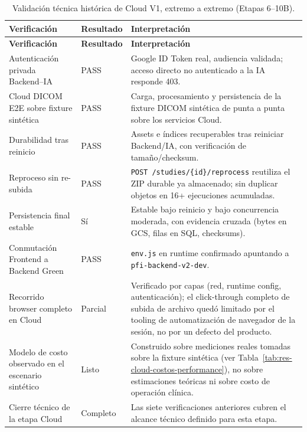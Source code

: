 {\scriptsize
\setlength{\LTleft}{0pt}
\setlength{\LTright}{0pt}
\setlength{\tabcolsep}{3pt}
\renewcommand{\arraystretch}{1.18}
\begin{longtable}{>{\raggedright\arraybackslash}p{} >{\raggedright\arraybackslash}p{} >{\raggedright\arraybackslash}p{}}
\caption{Validación técnica histórica de Cloud V1, extremo a extremo (Etapas 6--10B).}\label{tab:res-cloud-e2e}\\
\hline
\textbf{Verificación} & \textbf{Resultado} & \textbf{Interpretación} \\
\hline
\endfirsthead
\hline
\textbf{Verificación} & \textbf{Resultado} & \textbf{Interpretación} \\
\hline
\endhead
\hline
\endfoot
Autenticación privada Backend--IA & PASS & Google ID Token real, audiencia validada; acceso directo no autenticado a la IA responde 403. \\
Cloud DICOM E2E sobre fixture sintética & PASS & Carga, procesamiento y persistencia de la fixture DICOM sintética de punta a punta sobre los servicios Cloud. \\
Durabilidad tras reinicio & PASS & Assets e índices recuperables tras reiniciar Backend/IA, con verificación de tamaño/checksum. \\
Reproceso sin re-subida & PASS & \texttt{POST /studies/\{id\}/reprocess} reutiliza el ZIP durable ya almacenado; sin duplicar objetos en 16+ ejecuciones acumuladas. \\
Persistencia final estable & Sí & Estable bajo reinicio y bajo concurrencia moderada, con evidencia cruzada (bytes en GCS, filas en SQL, checksums). \\
Conmutación Frontend a Backend Green & PASS & \texttt{env.js} en runtime confirmado apuntando a \texttt{pfi-backend-v2-dev}. \\
Recorrido browser completo en Cloud & Parcial & Verificado por capas (red, runtime config, autenticación); el click-through completo de subida de archivo quedó limitado por el tooling de automatización de navegador de la sesión, no por un defecto del producto. \\
Modelo de costo observado en el escenario sintético & Listo & Construido sobre mediciones reales tomadas sobre la fixture sintética (ver Tabla~\ref{tab:res-cloud-costos-performance}), no sobre estimaciones teóricas ni sobre costo de operación clínica. \\
Cierre técnico de la etapa Cloud & Completo & Las siete verificaciones anteriores cubren el alcance técnico definido para esta etapa. \\
\hline
\end{longtable}
}

